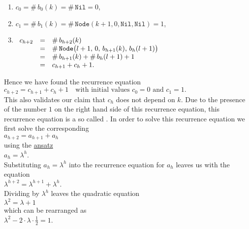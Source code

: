 \begin{enumerate}
\item $c_0 = \#\, b_0(k) = \#\, \mathtt{Nil} = 0$,
\item $c_1 = \#\, b_1(k) = \#\, \mathtt{Node}(k+1,0,\mathtt{Nil}, \mathtt{Nil}) = 1$, 
\item$\begin{array}[t]{lcl}
       c_{h+2} & = & \#\, b_{h+2}(k) \\
               & = & \#\,\mathtt{Node}\bigl(l+1,\,0,\,b_{h+1}(k),\,b_h(l+1)\bigr) \\
               & = & \#\, b_{h+1}(k) + \#\, b_h(l+1) + 1 \\
               & = & c_{h+1} + c_h + 1.
       \end{array}$
\end{enumerate}
Hence we have found the recurrence equation 
\\[0.2cm]
\hspace*{1.3cm}
$c_{h+2} = c_{h+1} + c_h + 1 \quad \mbox{with initial values $c_0 = 0$ and $c_1 = 1$}.$
\\[0.2cm]
This also validates our claim that $c_h$ does not depend on $k$.  Due to the presence of the number $1$ on the
right hand side of this recurrence equation, this recurrence equation is a so called 
.  In order to solve this recurrence
equation we first solve the corresponding  
\\[0.2cm]
\hspace*{1.3cm}
$a_{h+2} = a_{h+1} + a_h$
\\[0.2cm]
using the \href{https://en.wikipedia.org/wiki/Ansatz}{ansatz}
\\[0.2cm]
\hspace*{1.3cm}
$a_h = \lambda^h$.
\\[0.2cm]
Substituting $a_h = \lambda^h$ into the recurrence equation for $a_h$ leaves us with the equation
\\[0.2cm]
\hspace*{1.3cm}
$\lambda^{h+2} = \lambda^{h+1} + \lambda^{h}$.
\\[0.2cm]
Dividing by $\lambda^h$ leaves the quadratic equation
\\[0.2cm]
\hspace*{1.3cm}
$\lambda^2 = \lambda + 1$
\\[0.2cm]
which can be rearranged as
\\[0.2cm]
\hspace*{1.3cm}
$\lambda^2 - 2 \cdot \lambda \cdot \frac{1}{2} = 1$.

